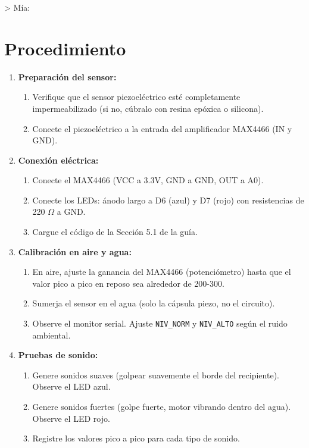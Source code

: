 > Mía:
\section*{Procedimiento}
\begin{enumerate}
    \item \textbf{Preparación del sensor:}
    \begin{enumerate}
        \item Verifique que el sensor piezoeléctrico esté completamente impermeabilizado (si no, cúbralo con resina epóxica o silicona).
        \item Conecte el piezoeléctrico a la entrada del amplificador MAX4466 (IN y GND).
    \end{enumerate}
    \item \textbf{Conexión eléctrica:}
    \begin{enumerate}
        \item Conecte el MAX4466 (VCC a 3.3V, GND a GND, OUT a A0).
        \item Conecte los LEDs: ánodo largo a D6 (azul) y D7 (rojo) con resistencias de 220 $\Omega$ a GND.
        \item Cargue el código de la Sección 5.1 de la guía.
    \end{enumerate}
    \item \textbf{Calibración en aire y agua:}
    \begin{enumerate}
        \item En aire, ajuste la ganancia del MAX4466 (potenciómetro) hasta que el valor pico a pico en reposo sea alrededor de 200-300.
        \item Sumerja el sensor en el agua (solo la cápsula piezo, no el circuito).
        \item Observe el monitor serial. Ajuste \texttt{NIV\_NORM} y \texttt{NIV\_ALTO} según el ruido ambiental.
    \end{enumerate}
    \item \textbf{Pruebas de sonido:}
    \begin{enumerate}
        \item Genere sonidos suaves (golpear suavemente el borde del recipiente). Observe el LED azul.
        \item Genere sonidos fuertes (golpe fuerte, motor vibrando dentro del agua). Observe el LED rojo.
        \item Registre los valores pico a pico para cada tipo de sonido.
    \end{enumerate}
\end{enumerate}

